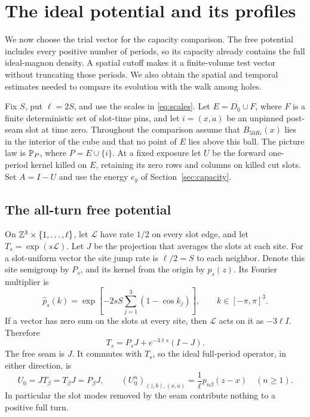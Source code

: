 \section{The ideal potential and its profiles}\label{sec:profiles}

We now choose the trial vector for the capacity comparison.
The free potential includes every positive number of periods, so its
capacity already contains the full ideal-magnon density.  A spatial
cutoff makes it a finite-volume test vector without truncating those
periods.  We also obtain the spatial and temporal estimates needed to
compare its evolution with the walk among holes.

Fix $S$, put $\ell=2S$, and use the scales in \eqref{eq:scales}.
Let $E=D_0\cup F$, where $F$ is a finite deterministic set of
slot-time pins, and let $i=(x,a)$ be an unpinned post-seam slot at time
zero.  Throughout the comparison assume that $B_{50R_*}(x)$ lies in
the interior of the cube and that no point of $E$ lies above this
ball.  The picture law is $\mathbb P_P$, where $P=E\cup\{i\}$.
At a fixed exposure let $U$ be the forward one-period kernel killed
on $E$, retaining its zero rows and columns on killed cut slots.
Set $A=I-U$ and use the energy $e_y$ of
Section~\ref{sec:capacity}.

\subsection{The all-turn free potential}

On $\mathbb Z^3\times\{1,\ldots,\ell\}$, let $\mathscr L$ have rate
$1/2$ on every slot edge, and let $T_s=\exp(s\mathscr L)$.
Let $J$ be the projection that averages the slots at each site.
For a slot-uniform vector the site jump rate is $\ell/2=S$ to each
neighbor.  Denote this site semigroup by $P_s$, and its kernel from
the origin by $p_s(z)$.  Its Fourier multiplier is
\begin{equation}\label{eq:freemultiplier}
 \widehat p_s(k)
 =\exp\!\left[-2sS\sum_{j=1}^3(1-\cos k_j)\right],
 \qquad k\in[-\pi,\pi]^3.
\end{equation}
If a vector has zero sum on the slots at every site, then
$\mathscr L$ acts on it as $-3\ell I$.  Therefore
\begin{equation}\label{eq:slotdecomposition}
 T_s=P_sJ+e^{-3\ell s}(I-J).
\end{equation}
The free seam is $J$.  It commutes with $T_s$, so the ideal full-period
operator, in either direction, is
\[
 U_0=JT_\beta=T_\beta J=P_\beta J,
 \qquad
 (U_0^n)_{(z,b),(x,a)}=\frac1\ell p_{n\beta}(z-x)
 \quad(n\ge1).
\]
In particular the slot modes removed by the seam contribute nothing
to a positive full turn.

